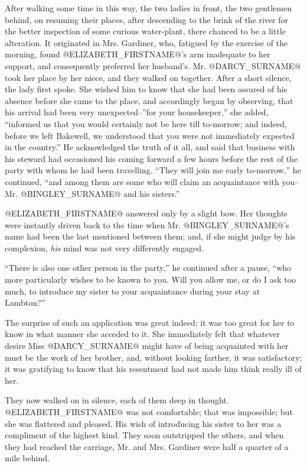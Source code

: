 After walking some time in this way, the two ladies in front, the two
gentlemen behind, on resuming their places, after descending to
the brink of the river for the better inspection of some curious
water-plant, there chanced to be a little alteration. It originated
in Mrs. Gardiner, who, fatigued by the exercise of the morning, found
@ELIZABETH_FIRSTNAME@'s arm inadequate to her support, and consequently preferred
her husband's. Mr. @DARCY_SURNAME@ took her place by her niece, and they walked on
together. After a short silence, the lady first spoke. She wished him
to know that she had been assured of his absence before she came to the
place, and accordingly began by observing, that his arrival had been
very unexpected--''for your housekeeper,'' she added, ``informed us that
you would certainly not be here till to-morrow; and indeed, before we
left Bakewell, we understood that you were not immediately expected
in the country.'' He acknowledged the truth of it all, and said that
business with his steward had occasioned his coming forward a few hours
before the rest of the party with whom he had been travelling. ``They
will join me early to-morrow,'' he continued, ``and among them are some
who will claim an acquaintance with you--Mr. @BINGLEY_SURNAME@ and his sisters.''

@ELIZABETH_FIRSTNAME@ answered only by a slight bow. Her thoughts were instantly
driven back to the time when Mr. @BINGLEY_SURNAME@'s name had been the last
mentioned between them; and, if she might judge by his complexion, \textit{his}
mind was not very differently engaged.

``There is also one other person in the party,'' he continued after a
pause, ``who more particularly wishes to be known to you. Will you allow
me, or do I ask too much, to introduce my sister to your acquaintance
during your stay at Lambton?''

The surprise of such an application was great indeed; it was too great
for her to know in what manner she acceded to it. She immediately felt
that whatever desire Miss @DARCY_SURNAME@ might have of being acquainted with her
must be the work of her brother, and, without looking farther, it was
satisfactory; it was gratifying to know that his resentment had not made
him think really ill of her.

They now walked on in silence, each of them deep in thought. @ELIZABETH_FIRSTNAME@
was not comfortable; that was impossible; but she was flattered and
pleased. His wish of introducing his sister to her was a compliment of
the highest kind. They soon outstripped the others, and when they had
reached the carriage, Mr. and Mrs. Gardiner were half a quarter of a
mile behind.

